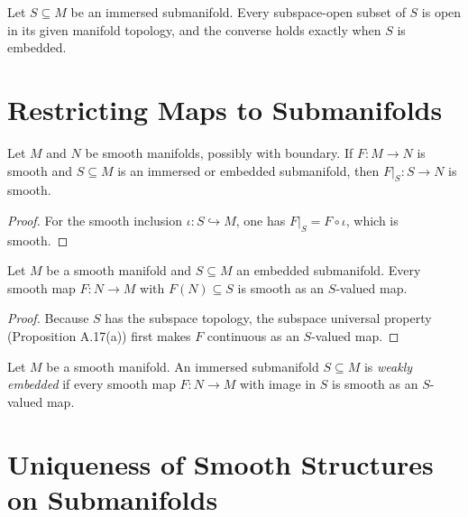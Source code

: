 \begin{proposition}
\label{exer:5-20}
\leanok
{}
Let $S\subseteq M$ be an immersed submanifold. Every subspace-open subset of
$S$ is open in its given manifold topology, and the converse holds exactly
when $S$ is embedded.
\end{proposition}


\section{Restricting Maps to Submanifolds}

\begin{theorem}
\label{thm:5-27}
\mathlibok
{}
Let $M$ and $N$ be smooth manifolds, possibly with boundary. If $F:M\to N$ is
smooth and $S\subseteq M$ is an immersed or embedded submanifold, then
$F|_S:S\to N$ is smooth.
\end{theorem}

\begin{proof}
For the smooth inclusion $\iota:S\hookrightarrow M$, one has
$F|_S=F\circ\iota$, which is smooth.
\end{proof}

\begin{corollary}
\label{cor:5-30}
\leanok
{}
Let $M$ be a smooth manifold and $S\subseteq M$ an embedded submanifold. Every
smooth map $F:N\to M$ with $F(N)\subseteq S$ is smooth as an $S$-valued map.
\end{corollary}

\begin{proof}
\leanok
\sketch Because $S$ has the subspace topology, the subspace universal property
(Proposition A.17(a)) first makes $F$ continuous as an $S$-valued map.
\end{proof}

\begin{definition}
\label{def:5-32-extra-2}
\leanok
Let $M$ be a smooth manifold. An immersed submanifold $S\subseteq M$ is
\emph{weakly embedded} if every smooth map $F:N\to M$ with image in $S$ is
smooth as an $S$-valued map.
\end{definition}


\section{Uniqueness of Smooth Structures on Submanifolds}

